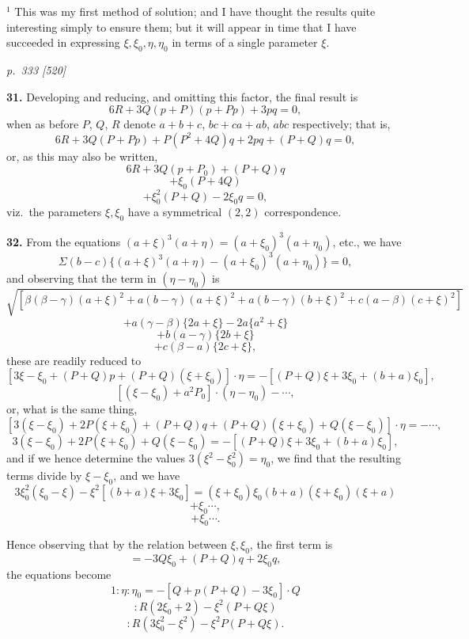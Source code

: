 \documentclass[11pt,a4paper]{article}
\theoremstyle{plain}
\theoremstyle{definition}
\begin{document}
\footnotesize
$^1$ This was my first method of solution; and I have thought the results quite interesting simply to ensure them; but it will appear in time that I have succeeded in expressing $\xi, \xi_0, \eta, \eta_0$ in terms of a single parameter $\xi$.

\clearpage

\bigskip
\textit{p.~333 [520]}
\smallskip

\textbf{31.} Developing and reducing, and omitting this factor, the final result is
\[
6R + 3Q(p + P)(p + Pp) + 3pq = 0,
\]
when as before $P$, $Q$, $R$ denote $a + b + c$, $bc + ca + ab$, $abc$ respectively; that is,
\[
6R + 3Q(P + Pp) + P(P^2 + 4Q)q + 2pq + (P + Q)q = 0,
\]
or, as this may also be written,
\[
6R + 3Q(p + P_0) + (P + Q)q
\]
\[
+ \xi_0 (P + 4Q)
\]
\[
+ \xi_0^2 (P + Q) - 2\xi_0 q = 0,
\]
viz.\ the parameters $\xi, \xi_0$ have a symmetrical $(2, 2)$ correspondence.

\textbf{32.} From the equations $(a + \xi)^3 (a + \eta) = (a + \xi_0)^3 (a + \eta_0)$, etc., we have
\[
\Sigma (b - c)\{(a + \xi)^3 (a + \eta) - (a + \xi_0)^3 (a + \eta_0)\} = 0,
\]
and observing that the term in $(\eta - \eta_0)$ is
\[
\sqrt{[\beta(\beta - \gamma)(a + \xi)^2 + a(b - \gamma)(a + \xi)^2 + a(b - \gamma)(b + \xi)^2 + c(a - \beta)(c + \xi)^2]}
\]
\[
+ a(\gamma - \beta)\{2a + \xi\} - 2a\{a^2 + \xi\}
\]
\[
+ b(a - \gamma)\{2b + \xi\}
\]
\[
+ c(\beta - a)\{2c + \xi\},
\]
these are readily reduced to
\[
[3\xi - \xi_0 + (P + Q)p + (P + Q)(\xi + \xi_0)] \cdot \eta = -[(P + Q)\xi + 3\xi_0 + (b + a)\xi_0],
\]
\[
[(\xi - \xi_0) + a^2 P_0]\cdot (\eta - \eta_0) - \cdots,
\]
or, what is the same thing,
\[
[3(\xi - \xi_0) + 2P(\xi + \xi_0) + (P + Q)q + (P + Q)(\xi + \xi_0) + Q(\xi - \xi_0)] \cdot \eta = -\cdots,
\]
\[
3(\xi - \xi_0) + 2P(\xi + \xi_0) + Q(\xi - \xi_0) = -[(P + Q)\xi + 3\xi_0 + (b + a)\xi_0],
\]
and if we hence determine the values $3(\xi^2 - \xi_0^2) = \eta_0$, we find that the resulting terms divide by $\xi - \xi_0$, and we have
\[
3\xi_0^2(\xi_0 - \xi) - \xi^2[(b + a)\xi + 3\xi_0] = (\xi + \xi_0)\xi_0(b + a)(\xi + \xi_0)(\xi + a)
\]
\[
+ \xi_0 \cdots,
\]
\[
+ \xi_0 \cdots.
\]

Hence observing that by the relation between $\xi, \xi_0$, the first term is
\[
= -3Q\xi_0 + (P + Q)q + 2\xi_0 q,
\]
the equations become
\[
1: \eta : \eta_0 = -[Q + p(P + Q) - 3\xi_0] \cdot Q
\]
\[
: R(2\xi_0 + 2) - \xi^2(P + Q\xi)
\]
\[
: R(3\xi_0^2 - \xi^2) - \xi^2 P(P + Q\xi).
\]

\clearpage
\end{document}
